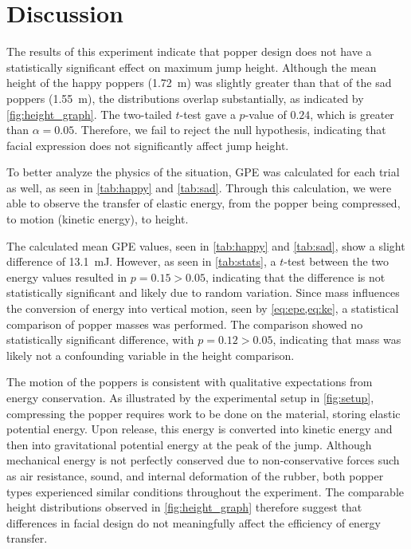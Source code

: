 \documentclass[amsmath,amssymb,aps, endfloats, linenumbers]{revtex4-2}
\begin{document}
\section{Discussion}
The results of this experiment indicate that popper design does not have a statistically significant effect on maximum jump height. Although the mean height of the happy poppers (\qty{1.72}{\meter}) was slightly greater than that of the sad poppers (\qty{1.55}{\meter}), the distributions overlap substantially, as indicated by \cref{fig:height_graph}. The two-tailed $t$-test gave a $p$-value of $0.24$, which is greater than $\alpha=0.05$. Therefore, we fail to reject the null hypothesis, indicating that facial expression does not significantly affect jump height. 

To better analyze the physics of the situation, GPE was calculated for each trial as well, as seen in \cref{tab:happy} and \cref{tab:sad}. Through this calculation, we were able to observe the transfer of elastic energy, from the popper being compressed, to motion (kinetic energy), to height. 

The calculated mean GPE values, seen in \cref{tab:happy} and \cref{tab:sad}, show a slight difference of \qty{13.1}{\milli\joule}. However, as seen in \cref{tab:stats}, a $t$-test between the two energy values resulted in $p=0.15 > 0.05$, indicating that the difference is not statistically significant and likely due to random variation. Since mass influences the conversion of energy into vertical motion, seen by \cref{eq:epe,eq:ke}, a statistical comparison of popper masses was performed. The comparison showed no statistically significant difference, with $p=0.12 > 0.05$, indicating that mass was likely not a confounding variable in the height comparison. 

The motion of the poppers is consistent with qualitative expectations from energy conservation. As illustrated by the experimental setup in \cref{fig:setup}, compressing the popper requires work to be done on the material, storing elastic potential energy. Upon release, this energy is converted into kinetic energy and then into gravitational potential energy at the peak of the jump. Although mechanical energy is not perfectly conserved due to non-conservative forces such as air resistance, sound, and internal deformation of the rubber, both popper types experienced similar conditions throughout the experiment. The comparable height distributions observed in \cref{fig:height_graph} therefore suggest that differences in facial design do not meaningfully affect the efficiency of energy transfer.
\end{document}
